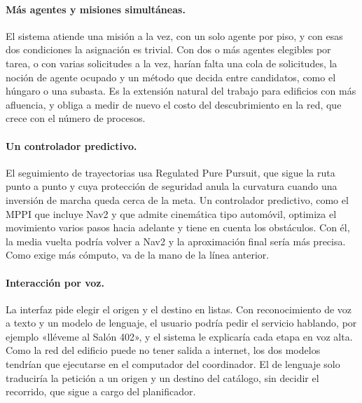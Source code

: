 \paragraph{Más agentes y misiones simultáneas.} El sistema atiende una misión a la
vez, con un solo agente por piso, y con esas dos condiciones la asignación es
trivial. Con dos o más agentes elegibles por tarea, o con varias solicitudes a la
vez, harían falta una cola de solicitudes, la noción de agente ocupado y un método
que decida entre candidatos, como el húngaro o una subasta. Es la extensión natural
del trabajo para edificios con más afluencia, y obliga a medir de nuevo el costo del
descubrimiento en la red, que crece con el número de procesos.

\paragraph{Un controlador predictivo.} El seguimiento de trayectorias usa
Regulated Pure Pursuit, que sigue la ruta punto a punto y cuya protección de
seguridad anula la curvatura cuando una inversión de marcha queda cerca de la
meta. Un controlador predictivo, como el MPPI que incluye Nav2 y que admite
cinemática tipo automóvil, optimiza el movimiento varios pasos hacia adelante y
tiene en cuenta los obstáculos. Con él, la media vuelta podría volver a Nav2 y
la aproximación final sería más precisa. Como exige más cómputo, va de la mano de la línea anterior.

\paragraph{Interacción por voz.} La interfaz pide elegir el origen y el destino
en listas. Con reconocimiento de voz a texto y un modelo de lenguaje, el usuario
podría pedir el servicio hablando, por ejemplo «lléveme al Salón 402», y el
sistema le explicaría cada etapa en voz alta. Como la red del edificio puede no
tener salida a internet, los dos modelos tendrían que ejecutarse en el computador del coordinador. El de lenguaje solo traduciría la petición a un origen y un
destino del catálogo, sin decidir el recorrido, que sigue a cargo del
planificador.
